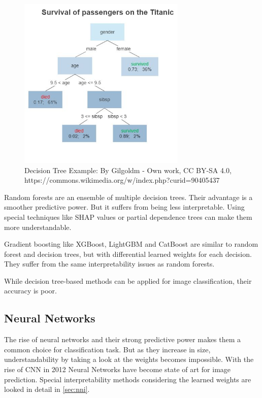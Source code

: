 \begin{figure}[h!]
	\centering
	\includegraphics[width=80mm]{figs/Decision_Tree}
	\caption{Decision Tree Example: By Gilgoldm - Own work, CC BY-SA 4.0, https://commons.wikimedia.org/w/index.php?curid=90405437}
	\label{fig:decision_tree}
\end{figure}
 

Random forests are an ensemble of multiple decision trees. Their advantage is a smoother predictive power. But it suffers from being less interpretable. Using special techniques like SHAP values \cite{lundberg2017unified} or partial dependence trees can make them more understandable.

Gradient boosting like XGBoost, LightGBM and CatBoost are similar to random forest and decision trees, but with differential learned weights for each decision. They suffer from the same interpretability issues as random  forests.

While decision tree-based methods can be applied for image classification, their accuracy is poor.


\subsection{Neural Networks}

The rise of neural networks and their strong predictive power makes them a common choice for classification task. But as they increase in size, understandability by taking a look at the weights becomes impossible. With the rise of CNN in 2012  \cite{krizhevsky2012nn} Neural Networks have become state of art for image prediction. Special interpretability methods considering the learned weights are looked in detail in \ref{sec:nni}.



